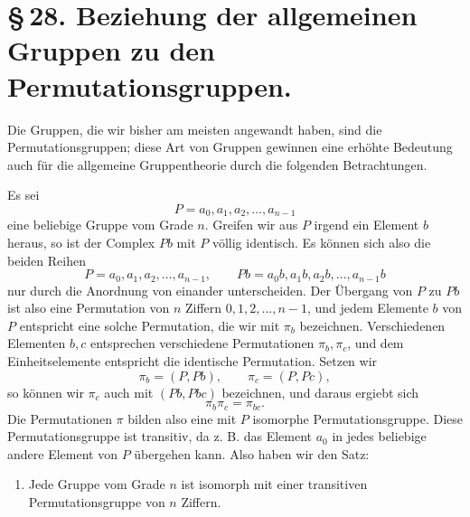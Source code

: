 \documentclass[11pt]{article}
\begin{document}
\section*{\S\,28. Beziehung der allgemeinen Gruppen zu den Permutationsgruppen.}

Die Gruppen, die wir bisher am meisten angewandt haben, sind die Permutationsgruppen; diese Art von Gruppen gewinnen eine erhöhte Bedeutung auch für die allgemeine Gruppentheorie durch die folgenden Betrachtungen.

Es sei
\begin{equation}
P=a_0,a_1,a_2,\ldots,a_{n-1}
\tag{1}
\end{equation}
eine beliebige Gruppe vom Grade $n$. Greifen wir aus $P$ irgend ein Element $b$ heraus, so ist der Complex $Pb$ mit $P$ völlig identisch. Es können sich also die beiden Reihen
\[
P=a_0,a_1,a_2,\ldots,a_{n-1},
\qquad
Pb=a_0b,a_1b,a_2b,\ldots,a_{n-1}b
\]
nur durch die Anordnung von einander unterscheiden. Der Übergang von $P$ zu $Pb$ ist also eine Permutation von $n$ Ziffern $0,1,2,\ldots,n-1$, und jedem Elemente $b$ von $P$ entspricht eine solche Permutation, die wir mit $\pi_b$ bezeichnen. Verschiedenen Elementen $b,c$ entsprechen verschiedene Permutationen $\pi_b,\pi_c$, und dem Einheitselemente entspricht die identische Permutation. Setzen wir
\[
\pi_b=(P,Pb),\qquad \pi_c=(P,Pc),
\]
so können wir $\pi_c$ auch mit $(Pb,Pbc)$ bezeichnen, und daraus ergiebt sich
\begin{equation}
\pi_b\pi_c=\pi_{bc}.
\tag{2}
\end{equation}
Die Permutationen $\pi$ bilden also eine mit $P$ isomorphe Permutationsgruppe. Diese Permutationsgruppe ist transitiv, da z. B. das Element $a_0$ in jedes beliebige andere Element von $P$ übergehen kann. Also haben wir den Satz:
\begin{enumerate}[label=\arabic*.,leftmargin=2.2em]
\item Jede Gruppe vom Grade $n$ ist isomorph mit einer transitiven Permutationsgruppe von $n$ Ziffern.
\end{enumerate}
\end{document}
